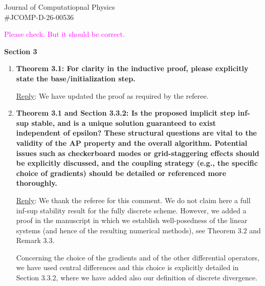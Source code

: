 \documentclass[letter,11pt]{letter}
\begin{document}
\begin{letter}{Journal of Computatiopnal Physics\\\#JCOMP-D-26-00536}
\begin{enumerate}
    {\large \textcolor{magenta}{Please check. But it should be correct.}}
    
\end{enumerate}

{\bf Section 3}
\begin{enumerate}
	\medskip
	\item
	{\bf Theorem 3.1: For clarity in the inductive proof, please explicitly state the base/initialization step.}
	
	\medskip
	{\sc\underline{Reply}}: We have updated the proof as required by the referee.
	
	\item 
	{\bf Theorem 3.1 and Section 3.3.2: Is the proposed implicit step inf-sup stable, and is a unique solution guaranteed to exist independent of epsilon? These structural questions are vital to the validity of the AP property and the overall algorithm. Potential issues such as checkerboard modes or grid-staggering effects should be explicitly discussed, and the coupling strategy (e.g., the specific choice of gradients) should be detailed or referenced more thoroughly.}
	
	\medskip
	{\sc\underline{Reply}}: We thank the referee for this comment. We do not claim here a full inf-sup stability result for the fully discrete scheme. 
	However, we added a proof in the manuscript in which we establish well-posedness of the linear systems (and hence of the resulting numerical methods), see Theorem 3.2 and Remark 3.3. 
	
	Concerning the choice of the gradients and of the other differential operators, we have used central differences and this choice is explicitly detailed in Section 3.3.2, where we have added also our definition of discrete divergence.
	
	

\end{enumerate}
\end{letter}
\end{document}
